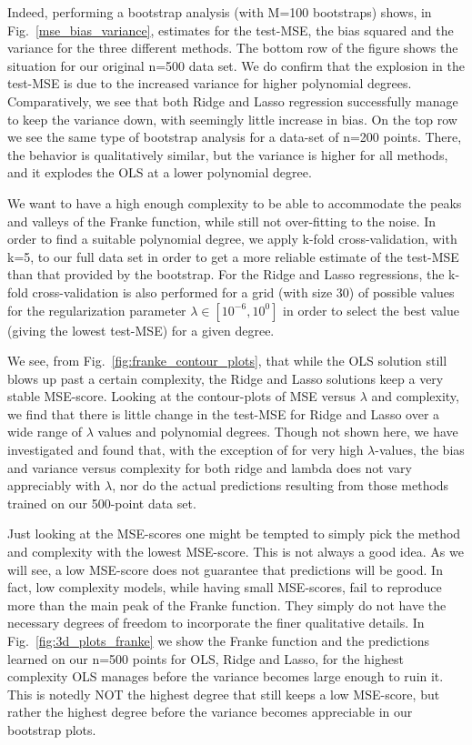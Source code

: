 \documentclass[reprint, english, nofootinbib]{revtex4-2}
\begin{document}
Indeed, performing a bootstrap analysis (with M=100 bootstraps) shows, in Fig.~\ref{mse_bias_variance}, estimates for the test-MSE, the bias squared and the variance for the three different methods. The bottom row of the figure shows the situation for our original n=500 data set. We do confirm that the explosion in the test-MSE is due to the increased variance for higher polynomial degrees. Comparatively, we see that both Ridge and Lasso regression successfully manage to keep the variance down, with seemingly little increase in bias. On the top row we see the same type of bootstrap analysis for a data-set of n=200 points. There, the behavior is qualitatively similar, but the variance is higher for all methods, and it explodes the OLS at a lower polynomial degree.

We want to have a high enough complexity to be able to accommodate the peaks and valleys of the Franke function, while still not over-fitting to the noise. In order to find a suitable polynomial degree, we apply k-fold cross-validation, with k=5, to our full data set in order to get a more reliable estimate of the test-MSE than that provided by the bootstrap. For the Ridge and Lasso regressions, the k-fold cross-validation is also performed for a grid (with size 30) of possible values for the regularization parameter $\lambda \in [10^{-6},10^{0}]$ in order to select the best value (giving the lowest test-MSE) for a given degree.

We see, from Fig.~\ref{fig:franke_contour_plots}, that while the OLS solution still blows up past a certain complexity, the Ridge and Lasso solutions keep a very stable MSE-score. Looking at the contour-plots of MSE versus $\lambda$ and complexity, we find that there is little change in the test-MSE for Ridge and Lasso over a wide range of $\lambda$ values and polynomial degrees. Though not shown here, we have investigated and found that, with the exception of for very high $\lambda$-values, the bias and variance versus complexity for both ridge and lambda does not vary appreciably with $\lambda$, nor do the actual predictions resulting from those methods trained on our 500-point data set.

Just looking at the MSE-scores one might be tempted to simply pick the method and complexity with the lowest MSE-score. This is not always a good idea. As we will see, a low MSE-score does not guarantee that predictions will be good. In fact, low complexity models, while having small MSE-scores, fail to reproduce more than the main peak of the Franke function. They simply do not have the necessary degrees of freedom to incorporate the finer qualitative details. In Fig.~\ref{fig:3d_plots_franke} we show the Franke function and the predictions learned on our n=500 points for OLS, Ridge and Lasso, for the highest complexity OLS manages before the variance becomes large enough to ruin it. This is notedly NOT the highest degree that still keeps a low MSE-score, but rather the highest degree before the variance becomes appreciable in our bootstrap plots.
\end{document}
